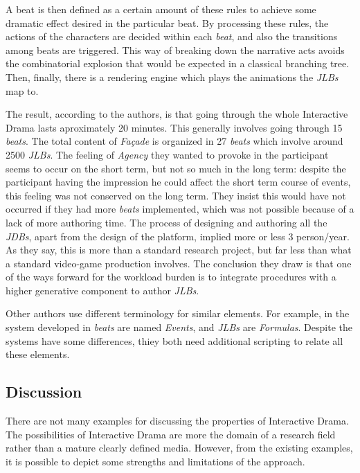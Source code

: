 \documentclass[
		twoside,openright,titlepage,numbers=noenddot,manychapters,
		headinclude,%
                footinclude=false,cleardoublepage=empty,
                BCOR=5mm,
		fontsize=11pt, %
                 enabledeprecatedfontcommands]{scrreprt}
\begin{document}
A beat is then defined as a certain amount of these rules to achieve some dramatic effect desired in the particular beat. By processing these rules, the actions of the characters are decided within each \emph{beat}, and also the transitions among beats are triggered. This way of breaking down the narrative acts avoids the combinatorial explosion that would be expected in a classical branching tree.  Then, finally, there is  a rendering engine which plays the animations the \emph{JLBs} map to.

The result, according to the authors, is that going through the whole Interactive Drama lasts aproximately 20 minutes. This generally involves going through 15 \emph{beats}. The total content of \emph{Fa{\c{c}}ade} is organized in 27 \emph{beats} which involve around 2500 \emph{JLBs}. The feeling of \emph{Agency} they wanted to provoke in the participant seems to occur on the short term, but not so much in the long term: despite the participant having the impression he could affect the short term course of events, this feeling was not conserved on the long term. They insist this would have not occurred if they had more \emph{beats} implemented, which was not possible because of a lack of more authoring time. The process of designing and authoring all the \emph{JDBs}, apart from the design of the platform, implied more or less 3 person/year. As they say, this is more than a standard research project, but far less than what a standard video-game production involves. The conclusion they draw is that one of the ways forward for the workload burden is to integrate procedures with a higher generative component to author \emph{JLBs}.

Other authors use different terminology for similar elements. For example, in the system developed in  \cite{crawford2004cci} \emph{beats} are named \emph{Events}, and \emph{JLBs} are \emph{Formulas}.
 Despite the systems have some differences, thiey both need additional scripting to relate all these elements.



\subsection{Discussion}

There are not many examples for discussing the properties of Interactive Drama. The possibilities of Interactive Drama are more the domain of a research field rather than a mature clearly defined media. However, from the existing examples, it is possible to depict some strengths and limitations of the approach.
\end{document}
